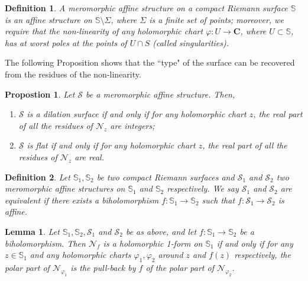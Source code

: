 \documentclass[11pt]{article}
\newtheorem{lemma}[thm]{Lemma}
\newtheorem{prop}[thm]{Propostion}
\newtheorem*{definition}{Definition}
\begin{document}
\begin{definition}
    A meromorphic affine structure on a compact Riemann surface $\mathbb{S}$ is an affine structure on $\mathbb{S}\setminus\Sigma$, where $\Sigma$ is a finite set of points; moreover, we require that the non-linearity of any holomorphic chart $\varphi:U\rightarrow\mathbf{C}$, where $U\subset\mathbb{S}$, has at worst poles at the points of $U\cap S$ (called singularities).
\end{definition}

The following Proposition shows that the ``type" of the surface can be recovered from the residues of the non-linearity.

\begin{prop}
    Let $\mathcal{S}$ be a meromorphic affine structure. Then,
    \begin{enumerate}
        \item $\mathcal{S}$ is a dilation surface if and only if for any holomorphic chart $z$, the real part of all the residues of $\mathcal{N}_{z}$ are integers;
        \item $\mathcal{S}$ is flat if and only if for any holomorphic chart $z$, the real part of all the residues of $\mathcal{N}_{z}$ are real.
    \end{enumerate}
\end{prop}

\begin{definition}
    Let $\mathbb{S}_{1},\mathbb{S}_{2}$ be two compact Riemann surfaces and $\mathcal{S}_{1}$ and $\mathcal{S}_{2}$ two meromorphic affine structures on $\mathbb{S}_{1}$ and $\mathbb{S}_{2}$ respectively. We say $\mathcal{S}_{1}$ and $\mathcal{S}_{2}$ are equivalent if there exists a biholomorphism $f:\mathbb{S}_{1}\rightarrow\mathbb{S}_{2}$ such that $f:\mathcal{S}_{1}\rightarrow\mathcal{S}_{2}$ is affine.
\end{definition}

\begin{lemma}
\label{lem:aff_parti_pol}
    Let $\mathbb{S}_{1},\mathbb{S}_{2},\mathcal{S}_{1}$ and $\mathcal{S}_{2}$ be as above, and let $f:\mathbb{S}_{1}\rightarrow\mathbb{S}_{2}$ be a biholomorphism. Then $\mathcal{N}_{f}$ is a holomorphic 1-form on $\mathbb{S}_{1}$ if and only if for any $z\in\mathbb{S}_{1}$ and any holomorphic charts $\varphi_{1},\varphi_{2}$ around $z$ and $f(z)$ respectively, the polar part of $\mathcal{N}_{\varphi_{1}}$ is the pull-back by $f$ of the polar part of $\mathcal{N}_{\varphi_{2}}$.
\end{lemma}
\end{document}
